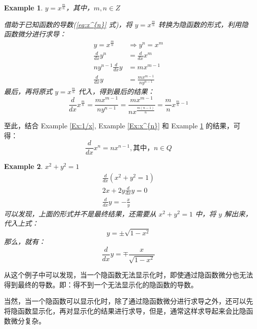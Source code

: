 \documentclass{ctexart}
\numberwithin{equation}{section}
\numberwithin{figure}{section}
\newtheorem{myEx}{Example}[section] %
\begin{document}
\begin{myEx}\label{Ex:x^{m/n}}
    \(y = x^{\frac{m}{n}}\)，其中，\(m,n\in Z\)

    借助于已知函数的导数(\ref{eq:x^{n}} 式)，将 \(y = x^{\frac{m}{n}}\) 转换为隐函数的形式，利用隐函数微分进行求导：
    \begin{align*}
        y = x^{\frac{m}{n}}   & \Rightarrow y^{n} = x^{m}   \\
        \frac{d}{dx}y^{n}     & = \frac{d}{dx}x^{m}         \\
        ny^{n-1}\frac{d}{dx}y & = mx^{m-1}                  \\
        \frac{d}{dx}y         & = \frac{mx^{m-1}}{ny^{n-1}}
    \end{align*}
    最后，再将原式 \(y = x^{\frac{m}{n}}\) 代入，得到最后的结果：
    \begin{equation}
        \frac{d}{dx}x^{\frac{m}{n}} = \frac{mx^{m-1}}{ny^{n-1}} = \frac{mx^{m-1}}{nx^{\frac{m(n-1)}{n}}} = \frac{m}{n}x^{\frac{m}{n} - 1}
    \end{equation}
\end{myEx}
至此，结合 Example \ref{Ex:1/x}, Example \ref{Ex:x^{n}} 和 Example \ref{Ex:x^{m/n}} 的结果，可得：
\begin{equation}
    \frac{d}{dx}x^{n} = nx^{n-1}, \text{其中，} n \in Q
\end{equation}

\begin{myEx}
    \(x^{2} + y^{2} = 1\)
    \begin{align*}
        \frac{d}{dx}\left(x^{2} + y^{2} = 1\right) \\
        2x + 2y\frac{d}{dx}y = 0                   \\
        \frac{d}{dx}y = - \frac{x}{y}
    \end{align*}
    可以发现，上面的形式并不是最终结果，还需要从 \(x^{2} + y^{2} = 1\) 中，将 \(y\) 解出来，代入上式：
    \begin{equation*}
        y = \pm \sqrt{1-x^{2}}
    \end{equation*}
    那么，就有：
    \begin{equation*}
        \frac{d}{dx}y = \mp \frac{x}{\sqrt{1-x^{2}}}
    \end{equation*}
\end{myEx}
从这个例子中可以发现，当一个隐函数无法显示化时，即使通过隐函数微分也无法得到最终的导数。即：得不到一个无法显示化的隐函数的导数。

当然，当一个隐函数可以显示化时，除了通过隐函数微分进行求导之外，还可以先将隐函数显示化，再对显示化的结果进行求导，但是，通常这样求导起来会比隐函数微分复杂。
\end{document}
